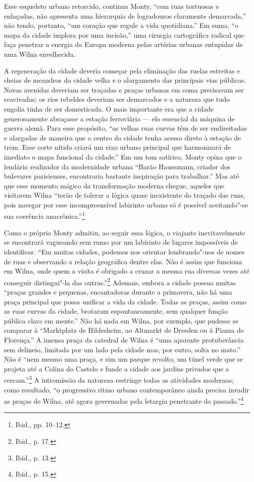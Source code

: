 Esse esqueleto urbano retorcido, continua Monty, ``com ruas tortuosas e
enlaçadas, não apresenta uma hierarquia de logradouros claramente
demarcada,'' não tendo, portanto, ``um coração que regule a vida
quotidiana.'' Em suma, ``o mapa da cidade implora por uma incisão,'' uma
cirurgia cartográfica radical que faça penetrar a energia da Europa
moderna pelas artérias urbanas entupidas de uma Wilna envelhecida.

A regeneração da cidade deveria começar pela eliminação das ruelas
estreitas e cheias de meandros da cidade velha e o alargamento das
principais vias públicas. Novas avenidas deveriam ser traçadas e praças
urbanas em coma precisavam ser reavivadas; os rios rebeldes deveriam ser
demarcados e a natureza que tudo engolia tinha de ser domesticada. O
mais importante era que a cidade generosamente abraçasse a estação
ferroviária --- elo essencial da máquina de guerra alemã. Para esse
propósito, ``as velhas ruas curvas têm de ser endireitadas e alargadas
de maneira que o centro da cidade tenha acesso direto à estação de trem.
Esse corte nítido criará um eixo urbano principal que harmonizará de
imediato o mapa funcional da cidade.'' Em um tom satírico, Monty opina
que o lendário realizador da modernidade urbana ``Barão Haussmann,
criador dos bulevares parisienses, encontraria bastante inspiração para
trabalhar.'' Mas até que esse momento mágico da transformação moderna
chegue, aqueles que visitarem Wilna ``terão de tolerar a lógica quase
inexistente do traçado das ruas, pois navegar por esse incompreensível
labirinto urbano só é possível aceitando"-se sua coerência
anacrônica.''\footnote{Ibid., pp. 10--12.}

Como o próprio Monty admitiu, ao seguir essa lógica, o viajante
inevitavelmente se encontrará vagueando sem rumo por um labirinto de
lugares impossíveis de identificar. ``Em muitas cidades, podemos nos
orientar lembrando"-nos de nomes de ruas e observando a relação
geográfica dentre elas. Não é assim que funciona em Wilna, onde quem a
visita é obrigado a cruzar a mesma rua diversas vezes até conseguir
distingui"-la das outras.''\footnote{Ibid., p. 17.} Ademais, embora a
cidade possua muitas ``praças grandes e pequenas, encantadoras durante a
primavera, não há uma praça principal que possa unificar a vida da
cidade. Todas as praças, assim como as ruas curvas da cidade, brotaram
espontaneamente, sem qualquer função pública clara em mente.'' Não há
nada em Wilna, por exemplo, que pudesse se comparar à ``Marktplatz de
Hildesheim, ao Altmarkt de Dresden ou à Piazza de Florença.'' A imensa
praça da catedral de Wilna é ``uma aparente protuberância sem delineio,
limitada por um lado pela cidade mas, por outro, solta no mato.'' Não é
``nem mesmo uma praça, e sim um parque revolto, um túnel verde que se
projeta até a Colina do Castelo e funde a cidade aos jardins privados
que a cercam.''\footnote{Ibid., p. 13.} A intromissão da natureza
restringe todas as atividades modernas; como resultado, ``o progressivo
ritmo urbano contemporâneo ainda precisa invadir as praças de Wilna, até
agora governadas pela letargia penetrante do passado.''\footnote{Ibid.,
  p. 15.}

